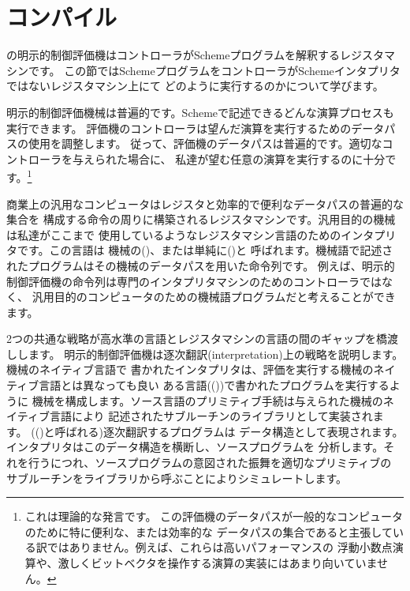 \section{コンパイル}
\label{Section 5.5}

の明示的制御評価機はコントローラがSchemeプログラムを解釈するレジスタマシンです。
この節ではSchemeプログラムをコントローラがSchemeインタプリタではないレジスタマシン上にて
どのように実行するのかについて学びます。

明示的制御評価機械は普遍的です。Schemeで記述できるどんな演算プロセスも実行できます。
評価機のコントローラは望んだ演算を実行するためのデータパスの使用を調整します。
従って、評価機のデータパスは普遍的です。適切なコントローラを与えられた場合に、
私達が望む任意の演算を実行するのに十分です。\footnote{これは理論的な発言です。
この評価機のデータパスが一般的なコンピュータのために特に便利な、または効率的な
データパスの集合であると主張している訳ではありません。例えば、これらは高いパフォーマンスの
浮動小数点演算や、激しくビットベクタを操作する演算の実装にはあまり向いていません。}

商業上の汎用なコンピュータはレジスタと効率的で便利なデータパスの普遍的な集合を
構成する命令の周りに構築されるレジスタマシンです。汎用目的の機械は私達がここまで
使用しているようなレジスタマシン言語のためのインタプリタです。この言語は
機械の()、または単純に()と
呼ばれます。機械語で記述されたプログラムはその機械のデータパスを用いた命令列です。
例えば、明示的制御評価機の命令列は専門のインタプリタマシンのためのコントローラではなく、
汎用目的のコンピュータのための機械語プログラムだと考えることができます。

2つの共通な戦略が高水準の言語とレジスタマシンの言語の間のギャップを橋渡しします。
明示的制御評価機は逐次翻訳(interpretation)上の戦略を説明します。機械のネイティブ言語で
書かれたインタプリタは、評価を実行する機械のネイティブ言語とは異なっても良い
ある言語(())で書かれたプログラムを実行するように
機械を構成します。ソース言語のプリミティブ手続は与えられた機械のネイティブ言語により
記述されたサブルーチンのライブラリとして実装されます。
(()と呼ばれる)逐次翻訳するプログラムは
データ構造として表現されます。インタプリタはこのデータ構造を横断し、ソースプログラムを
分析します。それを行うにつれ、ソースプログラムの意図された振舞を適切なプリミティブの
サブルーチンをライブラリから呼ぶことによりシミュレートします。

